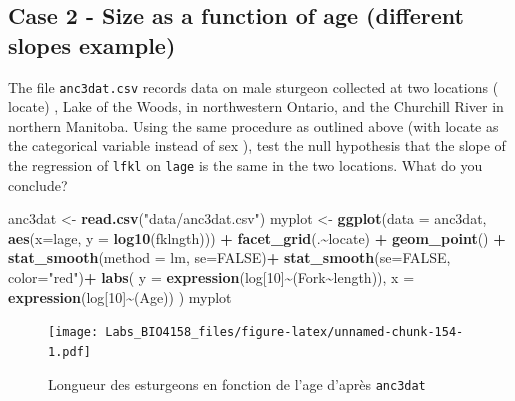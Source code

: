 \documentclass[
  12pt,
]{book}
\makeatletter
\newenvironment{Shaded}{\begin{snugshade}}{\end{snugshade}}
\newcommand{\DataTypeTok}[1]{\textcolor[rgb]{0.13,0.29,0.53}{#1}}
\newcommand{\DecValTok}[1]{\textcolor[rgb]{0.00,0.00,0.81}{#1}}
\newcommand{\KeywordTok}[1]{\textcolor[rgb]{0.13,0.29,0.53}{\textbf{#1}}}
\newcommand{\NormalTok}[1]{#1}
\newcommand{\OperatorTok}[1]{\textcolor[rgb]{0.81,0.36,0.00}{\textbf{#1}}}
\newcommand{\OtherTok}[1]{\textcolor[rgb]{0.56,0.35,0.01}{#1}}
\newcommand{\StringTok}[1]{\textcolor[rgb]{0.31,0.60,0.02}{#1}}
\newenvironment{kframe}{%
\medskip{}
\setlength{\fboxsep}{.8em}
\def\at@end@of@kframe{}%
\ifinner\ifhmode%
 \def\at@end@of@kframe{\end{minipage}}%
 \begin{minipage}{\columnwidth}%
\fi\fi%
\def\FrameCommand##1{\hskip\@totalleftmargin \hskip-\fboxsep
\colorbox{incolor}{##1}\hskip-\fboxsep
    \hskip-\linewidth \hskip-\@totalleftmargin \hskip\columnwidth}%
\MakeFramed {\advance\hsize-\width
  \@totalleftmargin\z@ \linewidth\hsize
  \@setminipage}}%
{\par\unskip\endMakeFramed%
\at@end@of@kframe}
\newenvironment{rmdblock}[1]
 {
 \begin{itemize}
 \renewcommand{\labelitemi}{
   \raisebox{-.7\height}[0pt][0pt]{
     {\setkeys{Gin}{width=3em,keepaspectratio}\texttt{[image: images/\#1]}}
   }
 }
 \begin{kframe}
 \setlength{\fboxsep}{1em}
 \item
 }
 {
 \end{kframe}
 \end{itemize}
 }
\newenvironment{rmdcode}
  {\begin{rmdblock}{screen}}
  {\end{rmdblock}}
\makeatother
\begin{document}
\hypertarget{case-2---size-as-a-function-of-age-different-slopes-example}{%
\subsection{Case 2 - Size as a function of age (different slopes example)}\label{case-2---size-as-a-function-of-age-different-slopes-example}}

\begin{rmdcode}
The file \texttt{anc3dat.csv} records data on male sturgeon collected at two locations ( locate) , Lake of the Woods, in northwestern Ontario, and the Churchill River in northern Manitoba. Using the same procedure as outlined above (with locate as the categorical variable instead of sex ), test the null hypothesis that the slope of the regression of \texttt{lfkl} on \texttt{lage} is the same in the two locations. What do you conclude?
\end{rmdcode}

\begin{Shaded}
\begin{Highlighting}[]
\NormalTok{anc3dat \textless{}{-}}\StringTok{ }\KeywordTok{read.csv}\NormalTok{(}\StringTok{"data/anc3dat.csv"}\NormalTok{)}
\NormalTok{myplot \textless{}{-}}\StringTok{ }\KeywordTok{ggplot}\NormalTok{(}\DataTypeTok{data =}\NormalTok{ anc3dat, }\KeywordTok{aes}\NormalTok{(}\DataTypeTok{x=}\NormalTok{lage, }\DataTypeTok{y =} \KeywordTok{log10}\NormalTok{(fklngth))) }\OperatorTok{+}
\StringTok{  }\KeywordTok{facet\_grid}\NormalTok{(.}\OperatorTok{\textasciitilde{}}\NormalTok{locate) }\OperatorTok{+}
\StringTok{  }\KeywordTok{geom\_point}\NormalTok{() }\OperatorTok{+}
\StringTok{  }\KeywordTok{stat\_smooth}\NormalTok{(}\DataTypeTok{method =}\NormalTok{ lm, }\DataTypeTok{se=}\OtherTok{FALSE}\NormalTok{)}\OperatorTok{+}
\StringTok{  }\KeywordTok{stat\_smooth}\NormalTok{(}\DataTypeTok{se=}\OtherTok{FALSE}\NormalTok{, }\DataTypeTok{color=}\StringTok{"red"}\NormalTok{)}\OperatorTok{+}
\StringTok{  }\KeywordTok{labs}\NormalTok{(}
    \DataTypeTok{y =} \KeywordTok{expression}\NormalTok{(log[}\DecValTok{10}\NormalTok{]}\OperatorTok{\textasciitilde{}}\NormalTok{(Fork}\OperatorTok{\textasciitilde{}}\NormalTok{length)),}
    \DataTypeTok{x =} \KeywordTok{expression}\NormalTok{(log[}\DecValTok{10}\NormalTok{]}\OperatorTok{\textasciitilde{}}\NormalTok{(Age))}
\NormalTok{)}
\NormalTok{myplot}
\end{Highlighting}
\end{Shaded}

\begin{figure}
\centering
\texttt{[image: Labs\_BIO4158\_files/figure-latex/unnamed-chunk-154-1.pdf]}
\caption{\label{fig:unnamed-chunk-154}Longueur des esturgeons en fonction de l'age d'après \texttt{anc3dat}}
\end{figure}
\end{document}
